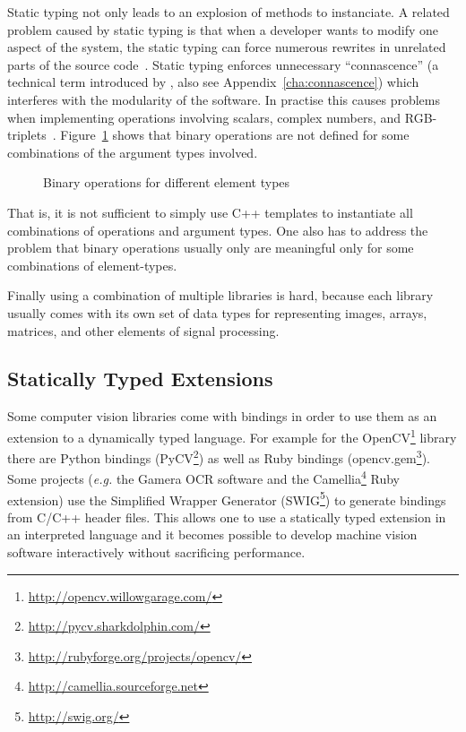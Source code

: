 \documentclass[12pt,a4paper,oneside,openright]{book}
\newcommand{\eg}{\emph{e.g.} }
\newcommand{\Eg}{For ex\-am\-ple }
\newcommand{\Ie}{That is, }
\newcommand{\anx}[1]{Appendix~\ref{cha:#1}}
\newcommand{\fig}[1]{Figure~\ref{fig:#1}}
\begin{document}
\begin{CJK}{UTF8}{}
Static typing not only leads to an explosion of methods to instanciate. A related problem caused by static typing is that when a developer wants to modify one aspect of the system, the static typing can force numerous rewrites in unrelated parts of the source code~\citep{RefWorks:486}. Static typing enforces unnecessary ``connascence'' (a technical term introduced by \citet{weirich2009}, also see \anx{connascence}) which interferes with the modularity of the software.
In practise this causes problems when implementing operations involving scalars, complex numbers, and \acs{RGB}-triplets~\citep{RefWorks:560}. \fig{ops} shows that binary operations are not defined for some combinations of the argument types involved.
\begin{figure}[htbp]
  \begin{center}
    \caption{Binary operations for
      different element types~\citep{RefWorks:560}\label{fig:ops}}
  \end{center}
\end{figure}
\Ie it is not sufficient to simply use C++ templates to instantiate all combinations of operations and argument types. One also has to address the problem that binary operations usually only are meaningful only for some combinations of element-types.

Finally using a combination of multiple libraries is hard, because each library usually comes with its own set of data types for representing images, arrays, matrices, and other elements of signal processing.

\subsection{Statically Typed Extensions}\label{cha:staticext}
Some computer vision libraries come with bindings in order to use them as an extension to a dynamically typed language. \Eg for the OpenCV\footnote{\url{http://opencv.willowgarage.com/}} library there are Python bindings (PyCV\footnote{\url{http://pycv.sharkdolphin.com/}}) as well as Ruby bindings (opencv.gem\footnote{\url{http://rubyforge.org/projects/opencv/}}). Some projects (\eg the Gamera \ac{OCR} software \citep{Droettboom03thegamera} and the Camellia\footnote{\url{http://camellia.sourceforge.net}} Ruby extension) use the Simplified Wrapper Generator (SWIG\footnote{\url{http://swig.org/}}) to generate bindings from C/C++ header files. This allows one to use a statically typed extension in an interpreted language and it becomes possible to develop machine vision software interactively without sacrificing performance.


\end{CJK}
\end{document}
